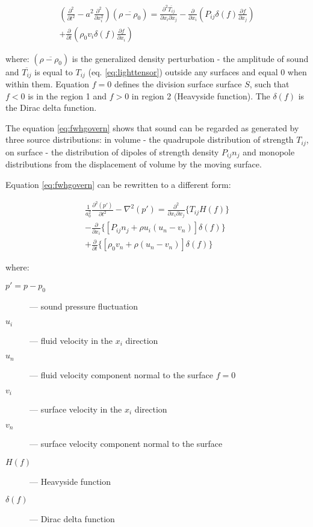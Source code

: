 \begin{equation} \label{eq:fwhgovern}
\begin{split}
\left( \frac{\partial^2}{\partial t^2} - a^2 \frac{\partial^2}{\partial x_i^2} \right)
\left( \overline{\rho - \rho_0} \right)
=
\frac{\partial^2 \overline{T_{ij}}}{\partial x_i \partial x_j}
- \frac{\partial}{\partial x_i} \left( P_{ij} \delta(f) \frac{\partial f}{\partial x_j} \right) \\
+ \frac{\partial}{\partial t} \left( \rho_0 v_i \delta(f) \frac{\partial f}{\partial x_i} \right)
\end{split}
\end{equation}

\noindent where: $\left( \overline{\rho - \rho_0} \right)$ is the generalized density perturbation - the amplitude of sound and $\overline{T_{ij}}$ is equal to $T_{ij}$ (eq. \ref{eq:lighttensor}) outside any surfaces and equal 0 when within them. Equation $f=0$ defines the division surface surface $S$, such that $f<0$ is in the region 1 and $f>0$ in region 2 (Heavyside function). The $\delta(f)$ is the Dirac delta function. 

The equation \ref{eq:fwhgovern} shows that sound can be regarded as generated by three source distributions: in volume - the quadrupole distribution of strength $T_{ij}$, on surface - the distribution of dipoles of strength density $P_{ij}n_j$ and monopole distributions from the displacement of volume by the moving surface.

Equation \ref{eq:fwhgovern} can be rewritten to a different form:

\begin{equation} \label{eq:fwhfluent}
\begin{split}
\frac{1}{a_0^2} \frac{\partial^2 \left(p'\right)}{\partial t^2}- \nabla^2  \left(p'\right)
= \frac{\partial^2}{\partial x_i \partial x_j} \lbrace T_{ij} H \left(f\right) \rbrace \\
- \frac{\partial}{\partial x_i} \lbrace \left[ P_{ij}n_j + \rho u_i \left( u_n - v_n \right) \right] \delta(f) \rbrace \\
+ \frac{\partial}{\partial t} \lbrace \left[ \rho_0 v_n + \rho \left( u_n - v_n \right) \right] \delta(f) \rbrace
\end{split}
\end{equation}

\noindent where:

\begin{description}
\item[$p' = p - p_0$] --- sound pressure fluctuation
\item[$u_i$] --- fluid velocity in the $x_i$ direction
\item[$u_n$] --- fluid velocity component normal to the surface $f = 0$
\item[$v_i$] --- surface velocity in the $x_i$ direction
\item[$v_n$] --- surface velocity component normal to the surface
\item[$H(f)$] --- Heavyside function
\item[$\delta(f)$] --- Dirac delta function
\end{description}

